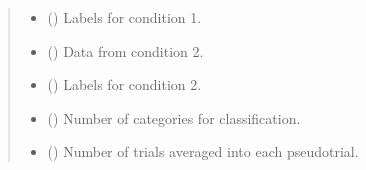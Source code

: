 \documentclass[letterpaper,10pt,english]{sphinxhowto}
\begin{document}
\begin{fulllineitems}
\begin{quote}
\begin{description}
\begin{itemize}
\item {} 
\sphinxAtStartPar
{} (\sphinxstyleliteralemphasis{\sphinxupquote{, }}\sphinxstyleliteralemphasis{\sphinxupquote{ {[}}}\sphinxstyleliteralemphasis{\sphinxupquote{, }}\sphinxstyleliteralemphasis{\sphinxupquote{{]}}}) \textendash{} Labels for condition 1.

\item {} 
\sphinxAtStartPar
{} (\sphinxstyleliteralemphasis{\sphinxupquote{, }}\sphinxstyleliteralemphasis{\sphinxupquote{ {[}}}\sphinxstyleliteralemphasis{\sphinxupquote{, }}\sphinxstyleliteralemphasis{\sphinxupquote{, }}\sphinxstyleliteralemphasis{\sphinxupquote{, }}\sphinxstyleliteralemphasis{\sphinxupquote{{]}}}) \textendash{} Data from condition 2.

\item {} 
\sphinxAtStartPar
{} (\sphinxstyleliteralemphasis{\sphinxupquote{, }}\sphinxstyleliteralemphasis{\sphinxupquote{ {[}}}\sphinxstyleliteralemphasis{\sphinxupquote{, }}\sphinxstyleliteralemphasis{\sphinxupquote{{]}}}) \textendash{} Labels for condition 2.

\item {} 
\sphinxAtStartPar
{} (\sphinxstyleliteralemphasis{\sphinxupquote{, }}) \textendash{} Number of categories for classification.

\item {} 
\sphinxAtStartPar
{} (\sphinxstyleliteralemphasis{\sphinxupquote{, }}) \textendash{} Number of trials averaged into each pseudo\sphinxhyphen{}trial.


\end{itemize}
\end{description}
\end{quote}
\end{fulllineitems}
\end{document}

